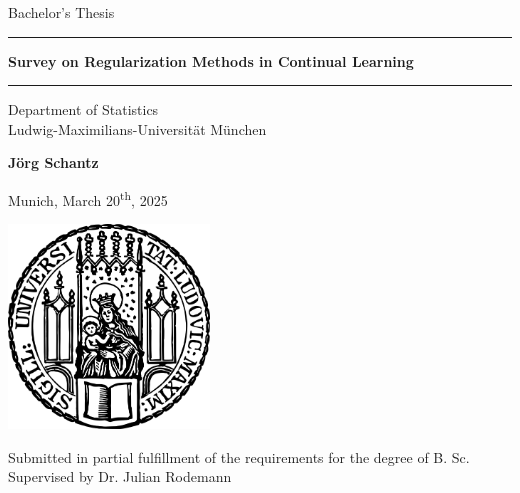 \documentclass[12pt]{article}
\newcommand{\mytitle}{Survey on Regularization Methods in Continual Learning}
\newcommand{\myname}{Jörg Schantz}
\newcommand{\mysupervisor}{Dr. Julian Rodemann}
\begin{document}
	
	
	\begin{titlepage}
		\begin{center}
			
			\LARGE
			Bachelor's Thesis
			
			\vspace{0.5cm}
			
			\rule{\textwidth}{1.5pt}
			\LARGE
			\textbf{\mytitle}
			\rule{\textwidth}{1.5pt}
			
			\vspace{0.5cm}
			
			\large
			Department of Statistics \\
			Ludwig-Maximilians-Universität München 
			
			\vfill
			
			\Large
			\textbf{\myname}
			
			\vfill
			
			\large
			Munich, March 20\textsuperscript{th}, 2025
			
			\vfill
			
			\includegraphics[width = 0.4\textwidth]{img/sigillum.png}
			
			\vfill
			
			\normalsize
			Submitted in partial fulfillment of the requirements for the degree of B. Sc.
			\\
			
			Supervised by \mysupervisor
			
		\end{center}
	\end{titlepage}
	
	
	\newpage
	
	\begin{abstract}
		
		Lorem ipsum dolor sit amet, consectetur adipiscing elit, sed do eiusmod tempor 
		incididunt ut labore et dolore magna aliqua. Ut enim ad minim veniam, quis 
		nostrud exercitation ullamco laboris nisi ut aliquip ex ea commodo consequat. 
		Duis aute irure dolor in reprehenderit in voluptate velit esse cillum dolore eu 
		fugiat nulla pariatur. Excepteur sint occaecat cupidatat non proident, sunt in 
		culpa qui officia deserunt mollit anim id est laborum. \cite{SB}
		
	\end{abstract}
	
\end{document}
